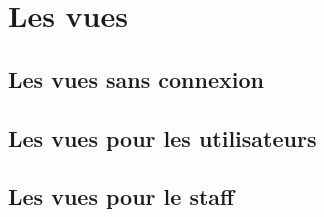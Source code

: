 \part{Les vues}

\chapter{Les vues sans connexion}







\chapter{Les vues pour les utilisateurs}





\chapter{Les vues pour le staff}













